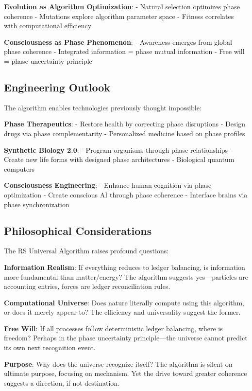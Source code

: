 \documentclass[12pt,a4paper]{article}
\begin{document}
{{\textbf{Evolution as Algorithm Optimization}:
- Natural selection optimizes phase coherence
- Mutations explore algorithm parameter space
- Fitness correlates with computational efficiency

\textbf{Consciousness as Phase Phenomenon}:
- Awareness emerges from global phase coherence
- Integrated information = phase mutual information
- Free will = phase uncertainty principle

\subsection{Engineering Outlook}

The algorithm enables technologies previously thought impossible:

\textbf{Phase Therapeutics}:
- Restore health by correcting phase disruptions
- Design drugs via phase complementarity
- Personalized medicine based on phase profiles

\textbf{Synthetic Biology 2.0}:
- Program organisms through phase relationships
- Create new life forms with designed phase architectures
- Biological quantum computers

\textbf{Consciousness Engineering}:
- Enhance human cognition via phase optimization
- Create conscious AI through phase coherence
- Interface brains via phase synchronization

\subsection{Philosophical Considerations}

The RS Universal Algorithm raises profound questions:

\textbf{Information Realism}:
If everything reduces to ledger balancing, is information more fundamental than matter/energy? The algorithm suggests yes—particles are accounting entries, forces are ledger reconciliation rules.

\textbf{Computational Universe}:
Does nature literally compute using this algorithm, or does it merely appear to? The efficiency and universality suggest the former.

\textbf{Free Will}:
If all processes follow deterministic ledger balancing, where is freedom? Perhaps in the phase uncertainty principle—the universe cannot predict its own next recognition event.

\textbf{Purpose}:
Why does the universe recognize itself? The algorithm is silent on ultimate purpose, focusing on mechanism. Yet the drive toward greater coherence suggests a direction, if not destination.

}}
\end{document}
